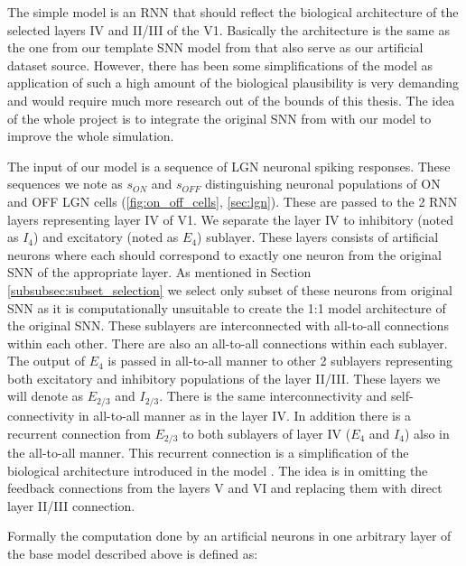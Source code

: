 The simple model is an RNN that should reflect the biological architecture of the selected layers IV and II/III of the V1. Basically the architecture is the same as the one from our template SNN model from \citet{antolik2024comprehensive} that also serve as our artificial dataset source. However, there has been some simplifications of the model as application of such a high amount of the biological plausibility is very demanding and would require much more research out of the bounds of this thesis. The idea of the whole project is to integrate the original SNN from \citet{antolik2024comprehensive} with our model to improve the whole simulation.

The input of our model is a sequence of LGN neuronal spiking responses. These sequences we note as $s_{ON}$ and $s_{OFF}$ distinguishing neuronal populations of ON and OFF LGN cells (\ref{fig:on_off_cells}, \ref{sec:lgn}). These are passed to the 2 RNN layers representing layer IV of V1. We separate the layer IV to inhibitory (noted as $I_4$) and excitatory (noted as $E_4$) sublayer. These layers consists of artificial neurons where each should correspond to exactly one neuron from the original SNN of the appropriate layer. As mentioned in Section \ref{subsubsec:subset_selection} we select only subset of these neurons from original SNN as it is computationally unsuitable to create the 1:1 model architecture of the original SNN. These sublayers are interconnected with all-to-all connections within each other. There are also an all-to-all connections within each sublayer. The output of $E_4$ is passed in all-to-all manner to other 2 sublayers representing both excitatory and inhibitory populations of the layer II/III. These layers we will denote as $E_{2/3}$ and $I_{2/3}$. There is the same interconnectivity and self-connectivity in all-to-all manner as in the layer IV. In addition there is a recurrent connection from $E_{2/3}$ to both sublayers of layer IV ($E_4$ and $I_4$) also in the all-to-all manner. This recurrent connection is a simplification of the biological architecture introduced in the model \citet{antolik2024comprehensive}. The idea is in omitting the feedback connections from the layers V and VI and replacing them with direct layer II/III connection. 

Formally the computation done by an artificial neurons in one arbitrary layer of the base model described above is defined as:

